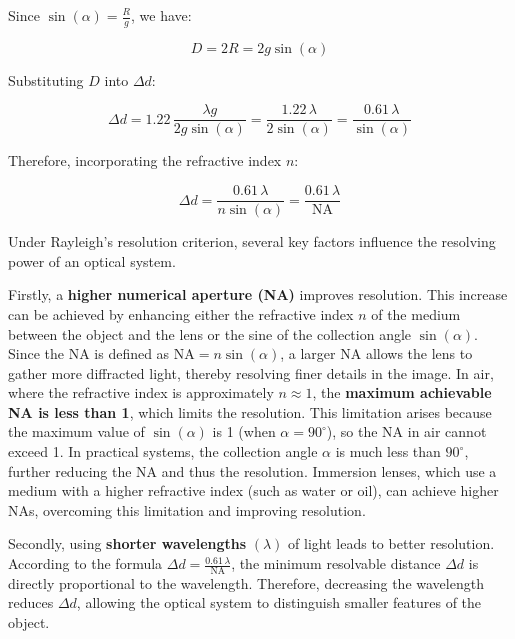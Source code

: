 \documentclass[
  a4paper,
]{book}
\begin{document}
Since \(\sin(\alpha) = \frac{R}{g}\), we have:

\[
   D = 2R = 2 g \sin(\alpha)
   \]

Substituting \(D\) into \(\Delta d\):

\[
   \Delta d = 1.22\, \frac{\lambda g}{2 g \sin(\alpha)} = \frac{1.22\, \lambda}{2 \sin(\alpha)} = \frac{0.61\, \lambda}{\sin(\alpha)}
   \]

Therefore, incorporating the refractive index \(n\):

\[
   \Delta d = \frac{0.61\, \lambda}{n \sin(\alpha)} = \frac{0.61\, \lambda}{\text{NA}}
   \]

Under Rayleigh's resolution criterion, several key factors influence the
resolving power of an optical system.

Firstly, a \textbf{higher numerical aperture (NA)} improves resolution.
This increase can be achieved by enhancing either the refractive index
\(n\) of the medium between the object and the lens or the sine of the
collection angle \(\sin(\alpha)\). Since the NA is defined as
\(\text{NA} = n \sin(\alpha)\), a larger NA allows the lens to gather
more diffracted light, thereby resolving finer details in the image. In
air, where the refractive index is approximately \(n \approx 1\), the
\textbf{maximum achievable NA is less than 1}, which limits the
resolution. This limitation arises because the maximum value of
\(\sin(\alpha)\) is 1 (when \(\alpha = 90^\circ\)), so the NA in air
cannot exceed 1. In practical systems, the collection angle \(\alpha\)
is much less than \(90^\circ\), further reducing the NA and thus the
resolution. Immersion lenses, which use a medium with a higher
refractive index (such as water or oil), can achieve higher NAs,
overcoming this limitation and improving resolution.

Secondly, using \textbf{shorter wavelengths} \((\lambda)\) of light
leads to better resolution. According to the formula
\(\Delta d = \frac{0.61\, \lambda}{\text{NA}}\), the minimum resolvable
distance \(\Delta d\) is directly proportional to the wavelength.
Therefore, decreasing the wavelength reduces \(\Delta d\), allowing the
optical system to distinguish smaller features of the object.
\end{document}
